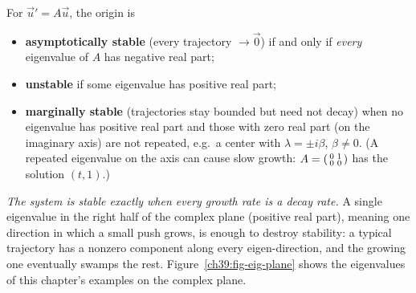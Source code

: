 \begin{theorem}
\label{ch39:thm-stability}
For $\vec u' = A\vec u$, the origin is
\begin{itemize}
\item \textbf{asymptotically stable} (every trajectory $\to \vec 0$) if and only
if \emph{every} eigenvalue of $A$ has negative real part;
\item \textbf{unstable} if some eigenvalue has positive real part;
\item \textbf{marginally stable} (trajectories stay bounded but need not decay)
when no eigenvalue has positive real part and those with zero real part (on the
imaginary axis) are
not repeated, e.g.\ a center with $\lambda = \pm i\beta$, $\beta \neq 0$. (A
repeated eigenvalue on the axis can cause slow growth: $A =
\begin{psmallmatrix}0 & 1\\ 0 & 0\end{psmallmatrix}$ has the solution
$(t, 1)$.)
\end{itemize}
\end{theorem}

\begin{intuitionbox}
\emph{The system is stable exactly when every growth
rate is a decay rate.} A single eigenvalue in the right half of the
complex plane (positive real part), meaning one direction in which a
small push grows, is enough to
destroy stability: a typical trajectory has a nonzero component
along every eigen-direction, and the growing one eventually swamps the rest.
Figure~\ref{ch39:fig-eig-plane} shows the eigenvalues of this chapter's
examples on the complex plane.
\end{intuitionbox}

